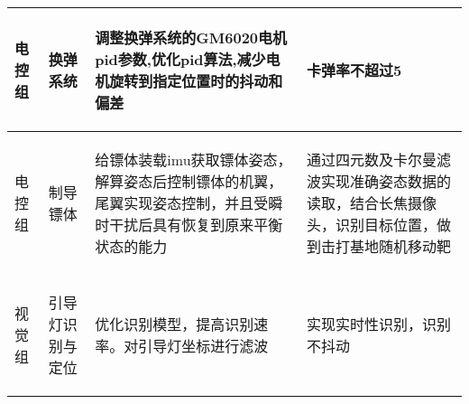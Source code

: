 \begin{longtable}{ p{1.5cm} | p{3cm} | p{6cm} | p{4.3cm} |}
    \hline

       \begin{center}
           电控组
       \end{center} &
       \begin{center}
           换弹系统
       \end{center} &
       \begin{center}
           调整换弹系统的GM6020电机pid参数,优化pid算法,减少电机旋转到指定位置时的抖动和偏差
       \end{center} &
       \begin{center}
           卡弹率不超过5%
       \end{center} \\
        
    \hline
    
        \begin{center}
            电控组
        \end{center}&
        \begin{center}
            制导镖体
        \end{center}&
        \begin{center}
            给镖体装载imu获取镖体姿态，解算姿态后控制镖体的机翼，尾翼实现姿态控制，并且受瞬时干扰后具有恢复到原来平衡状态的能力
        \end{center}&
        \begin{center}
            通过四元数及卡尔曼滤波实现准确姿态数据的读取，结合长焦摄像头，识别目标位置，做到击打基地随机移动靶
        \end{center}\\

    \hline
    

       \begin{center}
           视觉组
       \end{center} &
       \begin{center}
           引导灯识别与定位
       \end{center} &
       \begin{center}
           优化识别模型，提高识别速率。对引导灯坐标进行滤波
       \end{center} &
       \begin{center}
           实现实时性识别，识别不抖动
       \end{center} \\

    \hline
    
\end{longtable}

